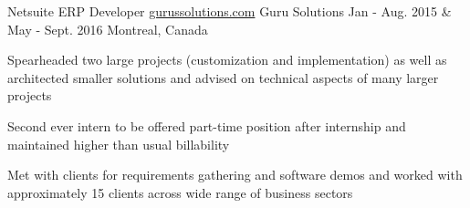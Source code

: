 \begin{cventries}
  \cventry
    {Netsuite ERP Developer \acvHeaderSocialSep \href{https://gurussolutions.com/}{gurussolutions.com}} %
    {Guru Solutions} %
    {Jan - Aug. 2015 \& May - Sept. 2016} %
    {Montreal, Canada} %
    {
      \begin{cvitems} %
        \item{ Spearheaded two large projects (customization and implementation) as well as architected smaller solutions and advised on technical aspects of many larger projects }
        \item{ Second ever intern to be offered part-time position after internship and maintained higher than usual billability }
        \item{ Met with clients for requirements gathering and software demos and worked with approximately 15 clients across wide range of business sectors }
      \end{cvitems}
    }

\end{cventries}
